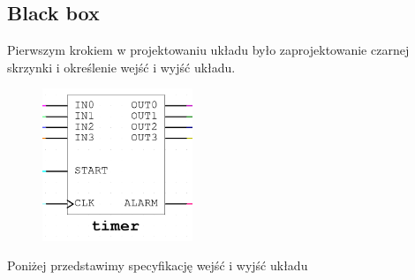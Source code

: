 \documentclass[a4paper]{article}
\begin{document}
\subsection{Black box}
Pierwszym krokiem w projektowaniu układu było zaprojektowanie czarnej skrzynki i określenie wejść i wyjść 
układu.
\begin{figure}[H]
    \centering
    \includegraphics[width=0.4\textwidth]{timer_black_box.png}
\end{figure}

Poniżej przedstawimy specyfikację wejść i wyjść układu
\end{document}
